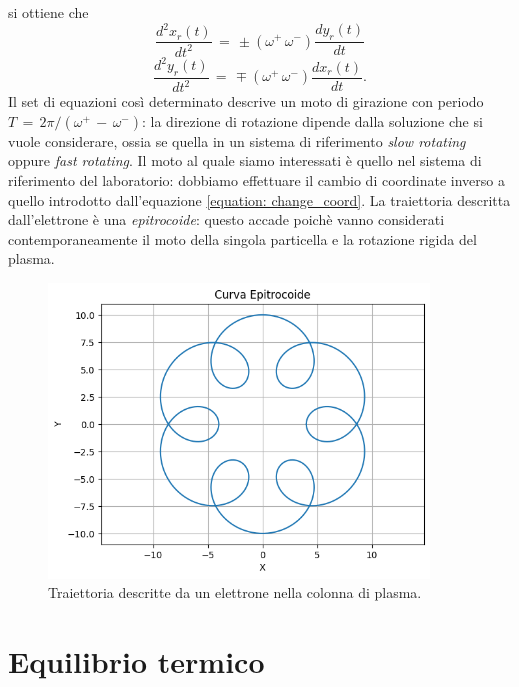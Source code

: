 si ottiene che 
\begin{equation}
    \frac{d^2x_r\left(t\right)}{dt^2}\,=\,\pm \left(\omega^+\,\omega^-\right)\frac{dy_r\left(t\right)}{dt}
    \label{equation: xcomp_singlepart1}
\end{equation}
\begin{equation}
    \frac{d^2y_r\left(t\right)}{dt^2}\,=\,\mp \left(\omega^+\,\omega^-\right)\frac{dx_r\left(t\right)}{dt}.
    \label{equation: ycomp_singlepart1}
\end{equation}
Il set di equazioni così determinato descrive un moto di girazione con periodo $T\,=\,2\pi/\left(\omega^+\,-\,\omega^-\right)$: la 
direzione di rotazione dipende dalla soluzione che si vuole considerare, ossia se quella in un sistema di riferimento \textit{slow rotating} 
oppure \textit{fast rotating}. Il moto al quale siamo interessati è quello nel sistema di riferimento del laboratorio: dobbiamo 
effettuare il cambio di coordinate inverso a quello introdotto dall'equazione \eqref{equation: change_coord}. La traiettoria 
descritta dall'elettrone è una \textit{epitrocoide}: questo accade poichè vanno considerati contemporaneamente il moto della singola 
particella e la rotazione rigida del plasma.
\begin{figure}[H]
    \centering
    \includegraphics[width=0.9\textwidth]{Immagini/CurvaEpitrocoide.png}
    \caption{Traiettoria descritte da un elettrone nella colonna di plasma. }
    \label{figure: CurvaEpitrocoide}
\end{figure}

\section{Equilibrio termico}

